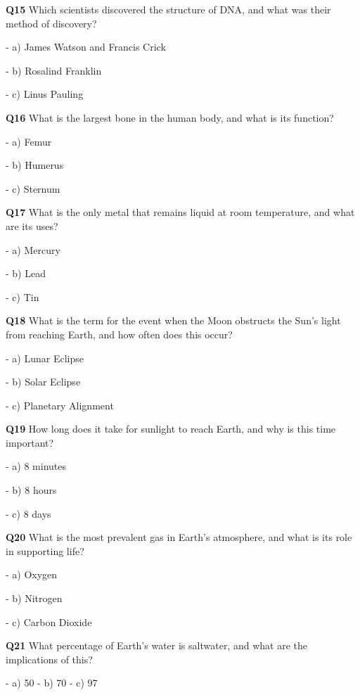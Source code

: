 \textbf{Q15} Which scientists discovered the structure of DNA, and what was their method of discovery?\par
\quad - a) James Watson and Francis Crick\par
\quad - b) Rosalind Franklin\par
\quad - c) Linus Pauling\par

\textbf{Q16} What is the largest bone in the human body, and what is its function?\par
\quad - a) Femur\par
\quad - b) Humerus\par
\quad - c) Sternum\par

\textbf{Q17} What is the only metal that remains liquid at room temperature, and what are its uses?\par
\quad - a) Mercury\par
\quad - b) Lead\par
\quad - c) Tin\par

\textbf{Q18} What is the term for the event when the Moon obstructs the Sun's light from reaching Earth, and how often does this occur?\par
\quad - a) Lunar Eclipse\par
\quad - b) Solar Eclipse\par
\quad - c) Planetary Alignment\par

\textbf{Q19} How long does it take for sunlight to reach Earth, and why is this time important?\par
\quad - a) 8 minutes\par
\quad - b) 8 hours\par
\quad - c) 8 days\par

\textbf{Q20} What is the most prevalent gas in Earth's atmosphere, and what is its role in supporting life?\par
\quad - a) Oxygen\par
\quad - b) Nitrogen\par
\quad - c) Carbon Dioxide\par

\textbf{Q21} What percentage of Earth's water is saltwater, and what are the implications of this?\par
\quad - a) 50%
\quad - b) 70%
\quad - c) 97%

